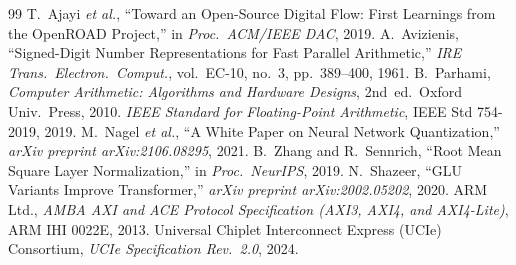 \documentclass[10pt,journal,compsoc]{IEEEtran}
\begin{document}
\begin{thebibliography}{99}
 T.~Ajayi \emph{et al.}, ``Toward an Open-Source Digital Flow: First Learnings from the OpenROAD Project,'' in \emph{Proc.\ ACM/IEEE DAC}, 2019.
 A.~Avizienis, ``Signed-Digit Number Representations for Fast Parallel Arithmetic,'' \emph{IRE Trans.\ Electron.\ Comput.}, vol.\ EC-10, no.\ 3, pp.\ 389--400, 1961.
 B.~Parhami, \emph{Computer Arithmetic: Algorithms and Hardware Designs}, 2nd~ed.\ Oxford Univ.\ Press, 2010.
 \emph{IEEE Standard for Floating-Point Arithmetic}, IEEE Std 754-2019, 2019.
 M.~Nagel \emph{et al.}, ``A White Paper on Neural Network Quantization,'' \emph{arXiv preprint arXiv:2106.08295}, 2021.
 B.~Zhang and R.~Sennrich, ``Root Mean Square Layer Normalization,'' in \emph{Proc.\ NeurIPS}, 2019.
 N.~Shazeer, ``GLU Variants Improve Transformer,'' \emph{arXiv preprint arXiv:2002.05202}, 2020.
 ARM Ltd., \emph{AMBA AXI and ACE Protocol Specification (AXI3, AXI4, and AXI4-Lite)}, ARM IHI 0022E, 2013.
 Universal Chiplet Interconnect Express (UCIe) Consortium, \emph{UCIe Specification Rev.\ 2.0}, 2024.
\end{thebibliography}
\end{document}
